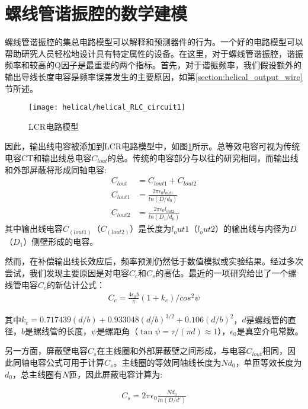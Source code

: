 \section[螺线管谐振腔的数学建模]{螺线管谐振腔的数学建模\label{section:helical_theory_model}}

螺线管谐振腔的集总电路模型可以解释和预测器件的行为。一个好的电路模型可以帮助研究人员轻松地设计具有特定属性的设备。在这里，对于螺线管谐振腔，谐振频率和较高的Q因子是最重要的两个指标。首先，对于谐振频率，我们假设额外的输出导线长度电容是频率误差发生的主要原因，如第\ref{section:helical_output_wire}节所述。

\begin{figure}
    \centering
    \caption[LCR电路模型]{LCR电路模型\label{fig:helical_RLC_circuit1}}
    \texttt{[image: helical/helical\_RLC\_circuit1]}
\end{figure}

因此，输出线电容被添加到LCR电路模型中，如图\ref{fig:helical_RLC_circuit1}所示。总等效电容可视为传统电容CT和输出线总电容$C_{lout}$的总。传统的电容部分与以往的研究相同，而输出线和外部屏蔽将形成同轴电容:
\begin{align} 
	C_{lout}&=C_{lout1}+C_{lout2} \label{eq:helical_lout}\\ 
	C_{lout1}&=\frac{2\pi\epsilon_0 l_{out1}}{ln(D/d_0)} \label{eq:helical_lout1}\\ 
	C_{lout2}&=\frac{2\pi\epsilon_0 l_{out2}}{ln(D_1/d_0)} \label{eq:helical_lout2}
\end{align}
其中输出线电容$C_(lout1)$（$C_(lout2)$）是长度为$l_out1$（$l_out2$）的输出线与内径为$D$（$D_1$）侧壁形成的电容。

然而，在补偿输出线长效应后，频率预测仍然低于数值模拟或实验结果。经过多次尝试，我们发现主要原因是对电容$C_c$和$C_s$的高估。最近的一项研究\cite[p52,f5.3]{article_2010}给出了一个螺线管电容$C_c$的新估计公式：
\begin{align}
    C_c=\frac{4\epsilon_0 b}{\pi}(1+k_c)/cos^2\psi 	\label{eq:helical_C_c_new}
\end{align}

其中$k_c=0.717439(d/b)+0.933048(d/b)^{3/2}+0.106(d/b)^2$，$d$是螺线管的直径，$b$是螺线管的长度，$\psi$是螺距角（$\tan\psi=\tau/(\pi d)\approx 1$），$\epsilon_0$是真空介电常数。

另一方面，屏蔽壁电容$C_s$在主线圈和外部屏蔽壁之间形成，与电容$C_{lout}$相同，因此同轴电容公式可用于计算$C_s$。主线圈的等效同轴线长度为$Nd_0$，单匝等效长度为$d_0$，总主线圈有$N$匝，因此屏蔽电容计算为:

\begin{align}
    C_s=2\pi\epsilon_0 \frac{Nd_0}{ln(D/d')} \label{eq:helical_C_s_new}
\end{align}

